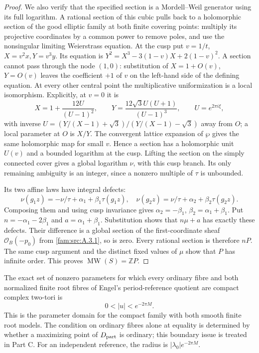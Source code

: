 \begin{proof}
We also verify that the specified section is a Mordell--Weil generator using its full logarithm. A rational section of this cubic pulls back to a holomorphic section of the good elliptic family at both finite covering points: multiply its projective coordinates by a common power to remove poles, and use the nonsingular limiting Weierstrass equation. At the cusp put $v=1/t$, $X=v^2x,Y=v^3y$. Its equation is $Y^2=X^3-3(1-v)X+2(1-v)^2$. A section cannot pass through the node $(1,0)$: substitution of $X=1+O(v)$, $Y=O(v)$ leaves the coefficient $+1$ of $v$ on the left-hand side of the defining equation. At every other central point the multiplicative uniformization is a local isomorphism. Explicitly, at $v=0$ it is
\[
 X=1+\frac{12U}{(U-1)^2},\qquad
 Y=\frac{12\sqrt3 U(U+1)}{(U-1)^3},\qquad U=e^{2\pi i\xi},
\]
with inverse $U=(Y/(X-1)+\sqrt3)/(Y/(X-1)-\sqrt3)$ away from $O$; a local parameter at $O$ is $X/Y$. The convergent lattice expansion of $\wp$ gives the same holomorphic map for small $v$. Hence a section has a holomorphic unit $U(v)$ and a bounded logarithm at the cusp. Lifting the section on the simply connected cover gives a global logarithm $\nu$, with this cusp branch. Its only remaining ambiguity is an integer, since a nonzero multiple of $\tau$ is unbounded.

Its two affine laws have integral defects:
\[
 \nu(g_1z)=-\nu/\tau+\alpha_1+\beta_1\tau(g_1z),\quad
 \nu(g_2z)=\nu/\tau+\alpha_2+\beta_2\tau(g_2z).
\]
Composing them and using cusp invariance gives $\alpha_2=-\beta_1$, $\beta_2=\alpha_1+\beta_1$. Put $n=-\alpha_1-2\beta_1$ and $a=\alpha_1+\beta_1$. Substitution shows that $n\mu+a$ has exactly these defects. Their difference is a global section of the first-coordinate sheaf $\mathcal O_B(-p_0)$ from \ref{fam:src:A.3.1}, so is zero. Every rational section is therefore $nP$. The same cusp argument and the distinct fixed values of $\mu$ show that $P$ has infinite order. This proves $\operatorname{MW}(S)=\mathbb ZP$. \end{proof}

\begin{proposition}\label{fam:src:B.1.2}\label{fam:st:B.1.2}
The exact set of nonzero parameters for which every ordinary fibre and both normalized finite root fibres of Engel's period-reference quotient are compact complex two-tori is
\[
 0<|u|<e^{-2\pi M}.
\]
This is the parameter domain for the compact family with both smooth finite root models. The condition on ordinary fibres alone at equality is determined by whether a maximizing point of $D_{\rm part}$ is ordinary; this boundary issue is treated in Part C. For an independent reference, the radius is $|\lambda_0|e^{-2\pi M}$.
\end{proposition}

